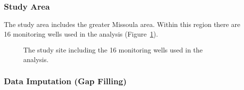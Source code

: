 \documentclass[
  letterpaper,
  DIV=11,
  numbers=noendperiod]{scrartcl}
\begin{document}
\subsubsection{Study Area}\label{study-area}

The study area includes the greater Missoula area. Within this region
there are 16 monitoring wells used in the analysis
(Figure~\ref{fig-site-map}).

\begin{figure}


\caption{\label{fig-site-map}The study site including the 16 monitoring
wells used in the analysis.}

\end{figure}%

\subsubsection{Data Imputation (Gap
Filling)}\label{data-imputation-gap-filling}
\end{document}

